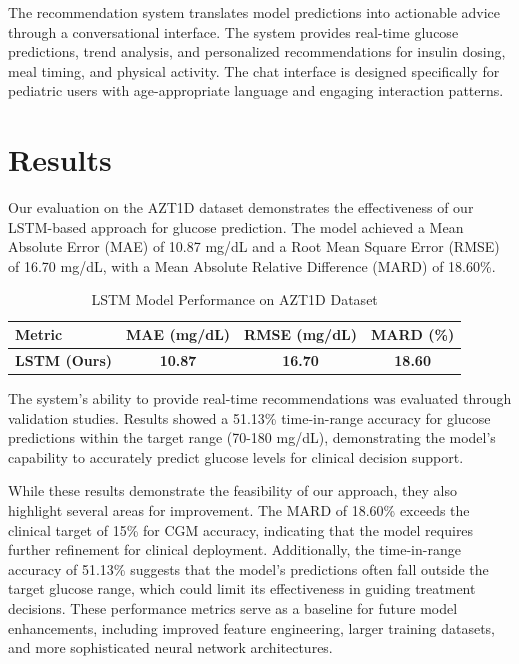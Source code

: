 \documentclass[acmsmall]{acmart}
\begin{document}
The recommendation system translates model predictions into actionable advice through a conversational interface. The system provides real-time glucose predictions, trend analysis, and personalized recommendations for insulin dosing, meal timing, and physical activity. The chat interface is designed specifically for pediatric users with age-appropriate language and engaging interaction patterns.

\section{Results}

Our evaluation on the AZT1D dataset demonstrates the effectiveness of our LSTM-based approach for glucose prediction. The model achieved a Mean Absolute Error (MAE) of 10.87 mg/dL and a Root Mean Square Error (RMSE) of 16.70 mg/dL, with a Mean Absolute Relative Difference (MARD) of 18.60\%.

\begin{table}[h]
  \caption{LSTM Model Performance on AZT1D Dataset}
  \label{tab:performance}
  \begin{tabular}{lccc}
    \toprule
    Metric               & MAE (mg/dL)    & RMSE (mg/dL)   & MARD (\%)      \\
    \midrule
    \textbf{LSTM (Ours)} & \textbf{10.87} & \textbf{16.70} & \textbf{18.60} \\
    \bottomrule
  \end{tabular}
\end{table}

The system's ability to provide real-time recommendations was evaluated through validation studies. Results showed a 51.13\% time-in-range accuracy for glucose predictions within the target range (70-180 mg/dL), demonstrating the model's capability to accurately predict glucose levels for clinical decision support.

While these results demonstrate the feasibility of our approach, they also highlight several areas for improvement. The MARD of 18.60\% exceeds the clinical target of 15\% for CGM accuracy, indicating that the model requires further refinement for clinical deployment. Additionally, the time-in-range accuracy of 51.13\% suggests that the model's predictions often fall outside the target glucose range, which could limit its effectiveness in guiding treatment decisions. These performance metrics serve as a baseline for future model enhancements, including improved feature engineering, larger training datasets, and more sophisticated neural network architectures.
\end{document}

